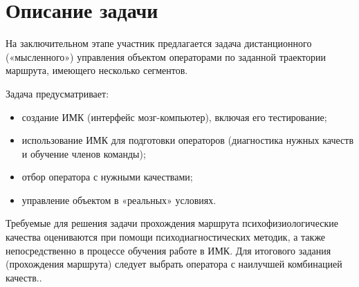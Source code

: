 \section{Описание задачи}

На заключительном этапе участник предлагается задача дистанционного («мысленного») управления объектом операторами по заданной траектории маршрута, имеющего несколько сегментов.

Задача предусматривает:
\begin{itemize}
    \item создание ИМК (интерфейс мозг-компьютер), включая его тестирование;
    \item использование ИМК для подготовки операторов (диагностика нужных качеств и обучение членов команды);
    \item отбор оператора с нужными качествами;
    \item управление объектом в «реальных» условиях.
\end{itemize}

Требуемые для решения задачи прохождения маршрута психофизиологические качества оцениваются при помощи психодиагностических методик, а также непосредственно в процессе обучения работе в ИМК. Для итогового задания (прохождения маршрута) следует выбрать оператора с наилучшей комбинацией качеств..
 
